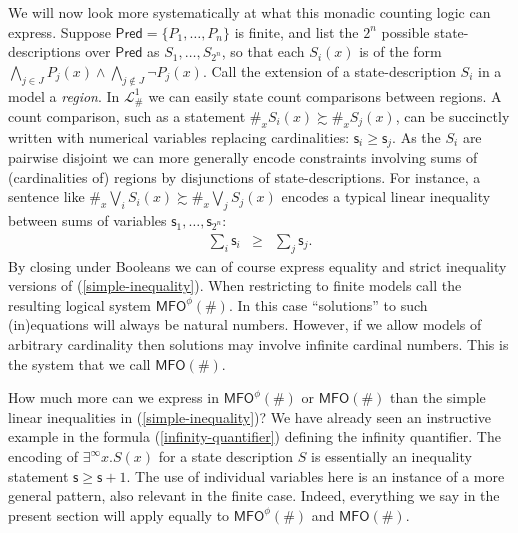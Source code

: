 \documentclass[12pt,oneside,reqno]{amsart}
\theoremstyle{definition}
\begin{document}
We will now look more systematically at what this monadic counting logic can express. 
Suppose $\mathsf{Pred} = \{P_1,\dots,P_n\}$ is  finite, and list the $2^n$ possible state-descriptions over $\mathsf{Pred}$ as $S_1,\dots,S_{2^n}$, so that each $S_i(x)$ is of the form $\bigwedge_{j \in J} P_j(x) \wedge \bigwedge_{j \notin J} \neg P_j(x)$. Call the extension of a state-description $S_i$ in a model a \emph{region}.  In $\mathcal{L}_\#^1$ we can easily state count comparisons between regions. A count comparison, such as a statement $\#_x S_i(x) \succsim \#_xS_j(x)$, can be succinctly written with numerical  variables replacing cardinalities: $\mathsf{s}_i \geq \mathsf{s}_j$. As the $S_i$ are pairwise disjoint we can more generally encode constraints involving sums of (cardinalities of) regions by disjunctions of state-descriptions. For instance, a sentence like $\#_x \bigvee_{i} S_i(x) \succsim \#_x \bigvee_j S_j(x)$ encodes a typical linear inequality between sums of variables $\mathsf{s}_1,\dots,\mathsf{s}_{2^n}$: \begin{eqnarray}
    \sum_{i} \mathsf{s}_i & \geq & \sum_j \mathsf{s}_j. \label{simple-inequality}
\end{eqnarray} By closing under Booleans we can of course express equality and strict inequality versions of (\ref{simple-inequality}). When restricting to finite models call the resulting logical system $\mathsf{MFO}^\phi(\#)$. In this case ``solutions'' to such (in)equations will always be natural numbers. However, if we allow models of arbitrary cardinality then solutions may involve infinite cardinal numbers. This is the system that we call  $\mathsf{MFO}(\#)$.

How much more can we express in $\mathsf{MFO}^\phi(\#)$ or $\mathsf{MFO}(\#)$ than the simple linear inequalities in (\ref{simple-inequality})? We have already seen an instructive example in the formula (\ref{infinity-quantifier}) defining the infinity quantifier. The encoding of $\exists^\infty x. S(x)$ for a state description $S$ is essentially an inequality statement $\mathsf{s} \geq \mathsf{s}+1$. The use of individual variables here is an instance of a more general pattern, also relevant in the finite case. Indeed, everything we say in the present section will apply equally to $\mathsf{MFO}^\phi(\#)$ and $\mathsf{MFO}(\#)$.
\end{document}
